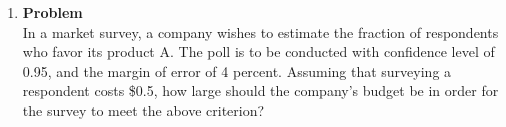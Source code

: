 \documentclass[12pt]{article}
\newenvironment{Ex}{\textbf{Problem}\vspace{.75em}\\}{}
\begin{document}
\begin{enumerate}
\begin{Ex}
\begin{solution}
\begin{enumerate}
\begin{table}[H]
\begin{tabularx}{\linewidth}{XX}
\begin{equation}
\begin{aligned}
                  \implies y &\ge 50 \\
                \end{aligned}
              \end{equation}
            \end{tabularx}
      \end{table}
        For precision,
        \begin{equation}
          \label{eq:4b-sol}
          \implies f_Y(y) = \left \{
            \begin{aligned}
              & \frac{1}{30 (y-50)^{2/3}} &&\quad y\le 1050 \\
              & 0 &&\quad\text{otherwise} \\
            \end{aligned} \right.
        \end{equation}
      \item It was given that $\hat{y}$ is constant and
        $E[\hat{V}]=16$. and we are tasked to find $\hat{y}$.
        \begin{equation}
          \label{eq:4c-sol}
          \begin{aligned}
            \hat{y} &= 50 + (\hat{v} + w - 15)^3 \\
            \hat{y} - 50 &= (\hat{v} + w - 15)^3 \\
            (\hat{y} - 50)^{1/3} &= \hat{v} + w - 15 \\
            &= E[\hat{V} + W - 15] \\
            &= E[\hat{V}] + E[W] - 15 \\
            &= 16+5-16 \\
            &= 6 \\
            \hat{y} - 50 &= 216 \\
          \implies \hat{y} &= 266 \\
          \end{aligned}
        \end{equation}
      \item {\color{red} \huge TODO}
      \end{enumerate}
    \end{solution}
  \end{Ex}

\item
  \begin{Ex}
    In a market survey, a company wishes to estimate the fraction of
    respondents who favor its product A. The poll is to be conducted
    with confidence level of 0.95, and the margin of error of 4
    percent. Assuming that surveying a respondent costs \$0.5, how
    large should the company’s budget be in order for the survey to
    meet the above criterion?


\end{Ex}
\end{enumerate}
\end{document}
